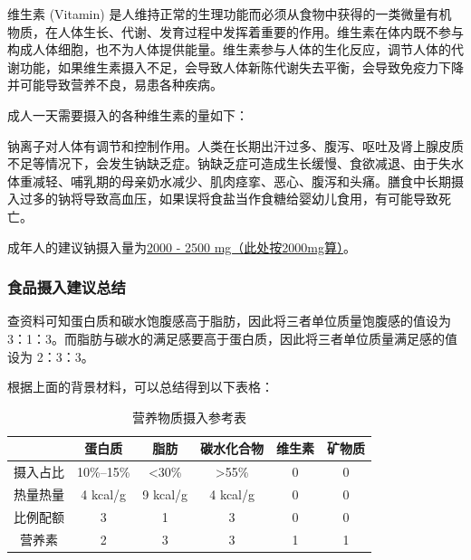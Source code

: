 \documentclass{SYSUReport}
\begin{document}
维生素 (Vitamin) 是人维持正常的生理功能而必须从食物中获得的一类微量有机物质，在人体生长、代谢、发育过程中发挥着重要的作用。维生素在体内既不参与构成人体细胞，也不为人体提供能量。维生素参与人体的生化反应，调节人体的代谢功能，如果维生素摄入不足，会导致人体新陈代谢失去平衡，会导致免疫力下降并可能导致营养不良，易患各种疾病。

成人一天需要摄入的各种维生素的量如下：
\begin{table}[h!]
\centering
\renewcommand\arraystretch{0.6}
\caption{营养物质摄入参考表}
\label{vitamin-table}
\end{table}

钠离子对人体有调节和控制作用。人类在长期出汗过多、腹泻、呕吐及肾上腺皮质不足等情况下，会发生钠缺乏症。钠缺乏症可造成生长缓慢、食欲减退、由于失水体重减轻、哺乳期的母亲奶水减少、肌肉痉挛、恶心、腹泻和头痛。膳食中长期摄入过多的钠将导致高血压，如果误将食盐当作食糖给婴幼儿食用，有可能导致死亡。

成年人的建议钠摄入量为\underline{2000 - 2500 mg（此处按2000mg算）}。

\subsubsection{食品摄入建议总结}
查资料可知蛋白质和碳水饱腹感高于脂肪，因此将三者单位质量饱腹感的值设为
3：1：3。而脂肪与碳水的满足感要高于蛋白质，因此将三者单位质量满足感的值设为
2：3：3。

根据上面的背景材料，可以总结得到以下表格：

\begin{table}[h!]
\centering
\renewcommand\arraystretch{0.65}
\begin{tabular}{cccccc}
\toprule
\quad & 蛋白质 & 脂肪 & 碳水化合物 & 维生素 & 矿物质 \\
\midrule
摄入占比 & 10\%--15\% & <30\% & >55\% & 0 & 0 \\
热量热量 & 4 kcal/g & 9 kcal/g & 4 kcal/g & 0 & 0 \\
比例配额 & 3 & 1 & 3 & 0 & 0 \\
营养素 & 2 & 3 & 3 & 1 & 1 \\
\bottomrule
\end{tabular}
\caption{营养物质摄入参考表}
\label{nutrients-table}
\end{table}
\end{document}
